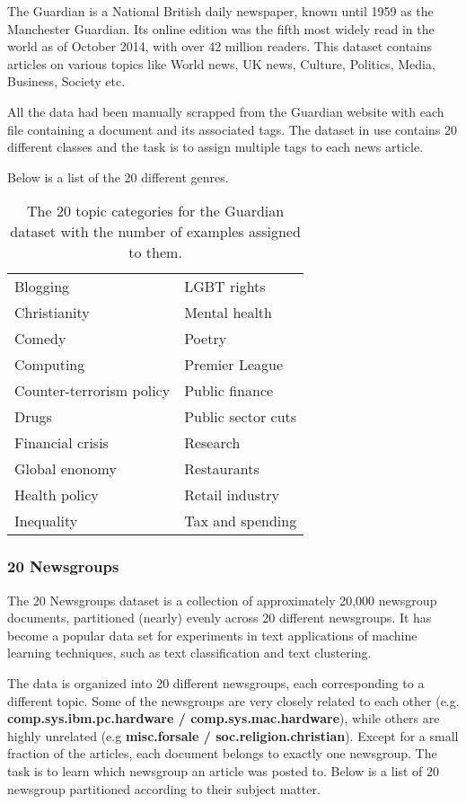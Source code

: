 The Guardian is a National British daily newspaper, known until 1959 as the Manchester Guardian. Its online edition was the fifth most widely read in the world as of October 2014, with over 42 million readers. This dataset contains articles on various topics like World news, UK news, Culture, Politics, Media, Business, Society etc.

All the data had been manually scrapped from the Guardian website with each file containing a document and its associated tags. The dataset in use contains 20 different classes and the task is to assign multiple tags to each news article.

Below is a list of the 20 different genres.

\begin{table}[htbp]
\begin{tabular}{l|l}
Blogging       & LGBT rights    \\
Christianity      & Mental health \\
Comedy     & Poetry       \\
Computing    & Premier League \\
Counter-terrorism policy      & Public finance   \\
Drugs      & Public sector cuts     \\
Financial crisis      & Research   \\
Global enonomy   & Restaurants   \\
Health policy & Retail industry     \\
Inequality     & Tax and spending      
\end{tabular}
\caption{\label{tab:widgets}The 20 topic categories for the Guardian dataset with the number of examples assigned to them.}
\end{table}

\newpage
\subsubsection{20 Newsgroups}

The 20 Newsgroups dataset is a collection of approximately 20,000 newsgroup documents, partitioned (nearly) evenly across 20 different newsgroups. It has become a popular data set for experiments in text applications of machine learning techniques, such as text classification and text clustering.

The data is organized into 20 different newsgroups, each corresponding to a different topic. Some of the newsgroups are very closely related to each other (e.g.\textbf{ comp.sys.ibm.pc.hardware / comp.sys.mac.hardware}), while others are highly unrelated (e.g \textbf{misc.forsale / soc.religion.christian}). Except for a small fraction of the articles, each document belongs to exactly one newsgroup. The task is to learn which newsgroup an article was posted to. Below is a list of 20 newsgroup partitioned according to their subject matter.\\

